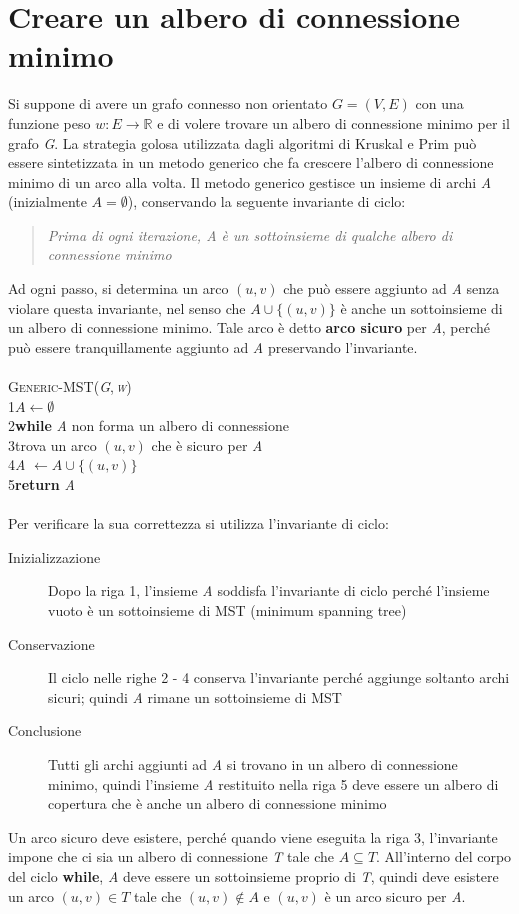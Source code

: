 \documentclass[10pt, a4paper]{report}
\newcommand\firsttab[1][0.5cm]{\hspace*{#1}}
\newcommand\secondtab[1][1cm]{\hspace*{#1}}
\begin{document}
\section{Creare un albero di connessione minimo}
Si suppone di avere un grafo connesso non orientato $G = (V,E)$ con una funzione peso $w : E \rightarrow \mathbb{R}$ e di volere trovare un albero di connessione minimo per il grafo \textit{G}. La strategia golosa utilizzata dagli algoritmi di Kruskal e Prim può essere sintetizzata in un metodo generico che fa crescere l'albero di connessione minimo di un arco alla volta. Il metodo generico gestisce un insieme di archi \textit{A} (inizialmente $A = \emptyset$), conservando la seguente invariante di ciclo:
\begin{quote}
\textit{Prima di ogni iterazione, A è un sottoinsieme di qualche albero di connessione minimo}
\end{quote}
Ad ogni passo, si determina un arco $(u,v)$ che può essere aggiunto ad \textit{A} senza violare questa invariante, nel senso che $A \cup \{(u,v)\}$ è anche un sottoinsieme di un albero di connessione minimo. Tale arco è detto \textbf{arco sicuro} per \textit{A}, perché può essere tranquillamente aggiunto ad \textit{A} preservando l'invariante.\\\\
\textsc{Generic-MST(\textit{G},\,\textit{w})}\\
1\firsttab$A \leftarrow \emptyset$\\
2\firsttab\textbf{while} \textit{A} non forma un albero di connessione\\
3\secondtab trova un arco $(u,v)$ che è sicuro per \textit{A}\\
4\secondtab\textit{A} $\leftarrow A \cup \{(u,v)\}$ \\
5\firsttab\textbf{return} \textit{A}\\\\
Per verificare la sua correttezza si utilizza l'invariante di ciclo:
\begin{description}
\item[Inizializzazione]Dopo la riga 1, l'insieme \textit{A} soddisfa l'invariante di ciclo perché l'insieme vuoto è un sottoinsieme di MST (minimum spanning tree)
\item[Conservazione]Il ciclo nelle righe 2 - 4 conserva l'invariante perché aggiunge soltanto archi sicuri; quindi \textit{A} rimane un sottoinsieme di MST
\item[Conclusione]Tutti gli archi aggiunti ad \textit{A} si trovano in un albero di connessione minimo, quindi l'insieme \textit{A} restituito nella riga 5 deve essere un albero di copertura che è anche un albero di connessione minimo
\end{description}
Un arco sicuro deve esistere, perché quando viene eseguita la riga 3, l'invariante impone che ci sia un albero di connessione \textit{T} tale che $A \subseteq T$. All'interno del corpo del ciclo \textbf{while}, \textit{A} deve essere un sottoinsieme proprio di \textit{T}, quindi deve esistere un arco $(u,v) \in T$ tale che $(u,v) \not\in A$ e $(u,v)$ è un arco sicuro per \textit{A}.
\end{document}
